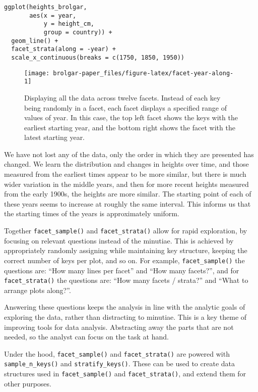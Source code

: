 \begin{verbatim}
ggplot(heights_brolgar,
       aes(x = year,
           y = height_cm,
           group = country)) + 
  geom_line() + 
  facet_strata(along = -year) + 
  scale_x_continuous(breaks = c(1750, 1850, 1950))
\end{verbatim}

\begin{figure}

{\centering \texttt{[image: brolgar-paper\_files/figure-latex/facet-year-along-1]} 

}

\caption{Displaying all the data across twelve facets. Instead of each key being randomly in a facet, each facet displays a specified range of values of year. In this case, the top left facet shows the keys with the earliest starting year, and the bottom right shows the facet with the latest starting year.}\label{fig:facet-year-along}
\end{figure}

We have not lost any of the data, only the order in which they are presented has changed. We learn the distribution and changes in heights over time, and those measured from the earliest times appear to be more similar, but there is much wider variation in the middle years, and then for more recent heights measured from the early 1900s, the heights are more similar. The starting point of each of these years seems to increase at roughly the same interval. This informs us that the starting times of the years is approximately uniform.

Together \texttt{facet\_sample()} and \texttt{facet\_strata()} allow for rapid exploration, by focusing on relevant questions instead of the minutiae. This is achieved by appropriately randomly assigning while maintaining key structure, keeping the correct number of keys per plot, and so on. For example, \texttt{facet\_sample()} the questions are: ``How many lines per facet'' and ``How many facets?'', and for \texttt{facet\_strata()} the questions are: ``How many facets / strata?'' and ``What to arrange plots along?''.

Answering these questions keeps the analysis in line with the analytic goals of exploring the data, rather than distracting to minutiae. This is a key theme of improving tools for data analysis. Abstracting away the parts that are not needed, so the analyst can focus on the task at hand.

Under the hood, \texttt{facet\_sample()} and \texttt{facet\_strata()} are powered with \texttt{sample\_n\_keys()} and \texttt{stratify\_keys()}. These can be used to create data structures used in \texttt{facet\_sample()} and \texttt{facet\_strata()}, and extend them for other purposes.

